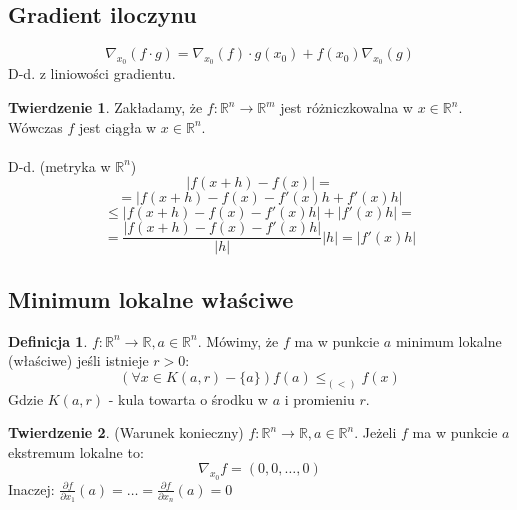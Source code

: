 \documentclass{article}
\theoremstyle{definition}
\newtheorem{de}{Definicja}[subsection]
\theoremstyle{definition}
\newtheorem{tw}{Twierdzenie}[subsection]
\theoremstyle{definition}
\theoremstyle{definition}
\begin{document}
\subsection{Gradient iloczynu}
\[\nabla_{x_0} (f\cdot g) = \nabla_{x_0} (f) \cdot g(x_0) + f(x_0) \nabla_{x_0} (g)\]
D-d. z liniowości gradientu.

\begin{tw}
Zakładamy, że $f: \mathbb{R}^n \rightarrow \mathbb{R}^m$ jest różniczkowalna w $x\in\mathbb{R}^n$.
Wówczas $f$ jest ciągła w $x\in\mathbb{R}^n$.\\\\
D-d. (metryka w $\mathbb{R}^n$)\\
\[|f(x+h)-f(x)|=\]
\[=|f(x+h)-f(x)-f'(x)h + f'(x)h|\]
\[\leq |f(x+h)-f(x)-f'(x)h|+|f'(x)h|=\]
\[=\frac{|f(x+h)-f(x)-f'(x)h|}{|h|} |h| = |f'(x)h|\]
\end{tw}

\subsection{Minimum lokalne właściwe}

\begin{de}
    $f:\mathbb{R}^n \rightarrow \mathbb{R}, a\in\mathbb{R}^n$. 
    Mówimy, że $f$ ma w punkcie $a$ minimum lokalne (właściwe)
    jeśli istnieje $r>0$:
    \[\left(\forall x\in K(a,r) - \{a\}\right) f(a) \leq_{(<)} f(x)\] 
    Gdzie $K(a,r)$ - kula towarta o środku w $a$ i promieniu $r$.
\end{de}

\begin{tw}
    (Warunek konieczny) $f: \mathbb{R}^n \rightarrow \mathbb{R}, a\in\mathbb{R}^n$.
    Jeżeli $f$ ma w punkcie $a$ ekstremum lokalne to:
    \[\nabla_{x_0} f = (0,0,\dots, 0)\]
    Inaczej:
    $\frac{\partial f}{\partial x_1} (a) = \dots = \frac{\partial f}{\partial x_n} (a) = 0$
\end{tw}
\end{document}
